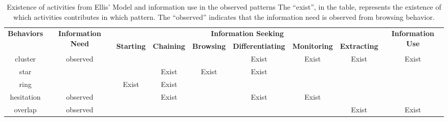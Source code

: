 \begin{table}[H]
    \small
    \centering
    \caption{Existence of activities from Ellis' Model and information use in the observed patterns
    The ``exist'', in the table, represents the existence of which activities contributes in which pattern.
    The ``observed'' indicates that the information need is observed from browsing behavior.}
    \begin{adjustbox}{width=\textwidth}
        \begin{tabular}{ccccccccc}
            \toprule
            \multicolumn{1}{c}{\multirow{2}{*}{\textbf{Behaviors}}}  & \multicolumn{1}{c}{\multirow{2}{*}{\textbf{Information Need}}} & \multicolumn{6}{c}{\textbf{Information Seeking}}                                    & \multicolumn{1}{c}{\multirow{2}{*}{\textbf{Information Use}}} \\ \cline{3-8}
            \multicolumn{1}{c}{}                                     & \multicolumn{1}{c}{}                                  & \textbf{Starting} & \textbf{Chaining} & \textbf{Browsing} & \textbf{Differentiating} & \textbf{Monitoring} & \textbf{Extracting} & \multicolumn{1}{c}{}  \\
            \hline
            cluster    &   observed &       &       &       & Exist & Exist & Exist & Exist \\
            star       &            &       & Exist & Exist & Exist &       &       &       \\
            ring       &            & Exist & Exist &       &       &       &       &       \\
            hesitation &   observed &       & Exist &       & Exist & Exist &       &       \\
            overlap    &   observed &       &       &       &       &       & Exist & Exist \\
            \bottomrule
        \end{tabular}
        \label{table:ellis-pattern}
    \end{adjustbox}
\end{table}

